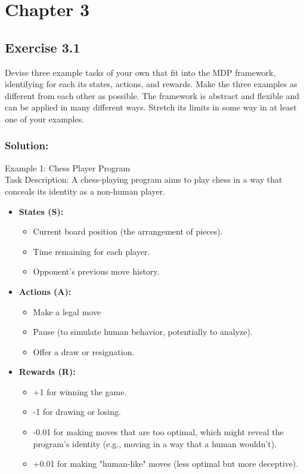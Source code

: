 \section*{Chapter 3}

\subsection*{Exercise 3.1}
Devise three example tasks of your own that fit into the MDP framework,
identifying for each its states, actions, and rewards. Make the three examples as different
from each other as possible. The framework is abstract and flexible and can be applied in
many different ways. Stretch its limits in some way in at least one of your examples.

\subsubsection*{Solution:}
Example 1: Chess Player Program\\
Task Description: A chess-playing program aims to play chess in a way that conceals its identity as a non-human player.

\begin{itemize}
    \item \textbf{States (S):}
    \begin{itemize}
        \item Current board position (the arrangement of pieces).
        \item Time remaining for each player.
        \item Opponent's previous move history.
    \end{itemize}
    
    \item \textbf{Actions (A):}
    \begin{itemize}
        \item Make a legal move
        \item Pause (to simulate human behavior, potentially to analyze).
        \item Offer a draw or resignation.
    \end{itemize}
    
    \item \textbf{Rewards (R):}
    \begin{itemize}
        \item +1 for winning the game.
        \item -1 for drawing or losing.
        \item -0.01 for making moves that are too optimal, which might reveal the program's identity (e.g., moving in a way that a human wouldn't).
        \item +0.01 for making "human-like" moves (less optimal but more deceptive).
    \end{itemize}
\end{itemize}

